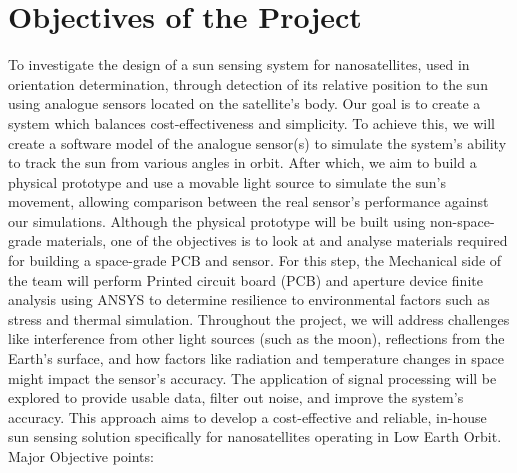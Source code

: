 \section{Objectives of the Project}
To investigate the design of a sun sensing system for nanosatellites, used in orientation determination, through detection of its relative position to the sun using analogue sensors located on the satellite's body. Our goal is to create a system which balances cost-effectiveness and simplicity.
To achieve this, we will create a software model of the analogue sensor(s) to simulate the system's ability to track the sun from various angles in orbit. After which, we aim to build a physical prototype and use a movable light source to simulate the sun's movement, allowing comparison between the real sensor's performance against our simulations.
Although the physical prototype will be built using non-space-grade materials, one of the objectives is to look at and analyse materials required for building a space-grade PCB and sensor. For this step, the Mechanical side of the team will perform Printed circuit board (PCB) and aperture device finite analysis using ANSYS to determine resilience to environmental factors such as stress and thermal simulation.
Throughout the project, we will address challenges like interference from other light sources (such as the moon), reflections from the Earth's surface, and how factors like radiation and temperature changes in space might impact the sensor's accuracy. The application of signal processing will be explored to provide usable data, filter out noise, and improve the system's accuracy.
This approach aims to develop a cost-effective and reliable, in-house sun sensing solution specifically for nanosatellites operating in Low Earth Orbit.
Major Objective points:
